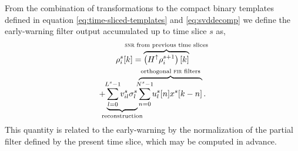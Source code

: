 From the combination of transformations to the compact binary templates defined
in equation \eqref{eq:time-sliced-templates} and \eqref{eq:svddecomp} we define
the early-warning filter output accumulated up to time slice $s$ as,
%
%
\begin{multline}
	\rho_i^s [k] =%
		\overbrace{
			\left(H^\uparrow \rho_i^{s+1}\right)[k]
		}^\textrm{\clap{{\sc snr} from previous time slices}} \\
		+
		\underbrace{
			\sum_{\mathclap{l=0}}^{\mathclap{L^s-1}} v_{il}^s \sigma_l^s
		}_\textrm{\clap{reconstruction}}
		\overbrace{
			\sum_{\mathclap{n=0}}^{\mathclap{N^s-1}} u_l^s[n] x^s[k-n]
		}^\textrm{\clap{orthogonal {\sc fir} filters}} .
\end{multline}
%
%
This quantity is related to the early-warning \SNR{} by the normalization
of the partial filter defined by the present time slice, which may be computed
in advance. 
%
%
